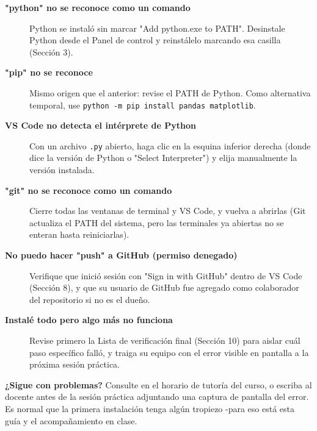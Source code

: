 \documentclass[11pt,a4paper]{article}
\newcommand{\code}[1]{\texttt{#1}}
\begin{document}
\begin{description}
  \item[\textcolor{alerta}{\textbf{"python" no se reconoce como un comando}}] Python se instaló sin marcar "Add python.exe to PATH". Desinstale Python desde el Panel de control y reinstálelo marcando esa casilla (Sección 3).

  \item[\textcolor{alerta}{\textbf{"pip" no se reconoce}}] Mismo origen que el anterior: revise el PATH de Python. Como alternativa temporal, use \code{python -m pip install pandas matplotlib}.

  \item[\textcolor{alerta}{\textbf{VS Code no detecta el intérprete de Python}}] Con un archivo \code{.py} abierto, haga clic en la esquina inferior derecha (donde dice la versión de Python o "Select Interpreter") y elija manualmente la versión instalada.

  \item[\textcolor{alerta}{\textbf{"git" no se reconoce como un comando}}] Cierre todas las ventanas de terminal y VS Code, y vuelva a abrirlas (Git actualiza el PATH del sistema, pero las terminales ya abiertas no se enteran hasta reiniciarlas).

  \item[\textcolor{alerta}{\textbf{No puedo hacer "push" a GitHub (permiso denegado)}}] Verifique que inició sesión con "Sign in with GitHub" dentro de VS Code (Sección 8), y que su usuario de GitHub fue agregado como colaborador del repositorio si no es el dueño.

  \item[\textcolor{alerta}{\textbf{Instalé todo pero algo más no funciona}}] Revise primero la Lista de verificación final (Sección 10) para aislar cuál paso específico falló, y traiga su equipo con el error visible en pantalla a la próxima sesión práctica.
\end{description}

\vspace{0.6cm}
\begin{tcolorbox}[colback=moradoClaro!30,colframe=morado,arc=3pt,boxrule=1pt]
\textbf{¿Sigue con problemas?} Consulte en el horario de tutoría del curso, o escriba al docente antes de la sesión práctica adjuntando una captura de pantalla del error. Es normal que la primera instalación tenga algún tropiezo -para eso está esta guía y el acompañamiento en clase.
\end{tcolorbox}
\end{document}
